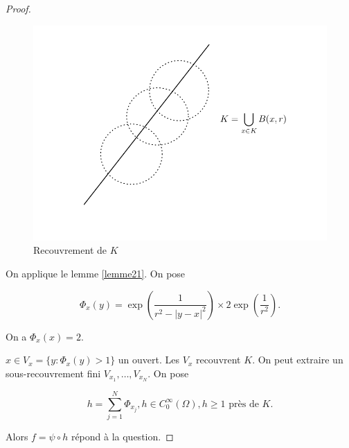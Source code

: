 \documentclass[french]{book}
\theoremstyle{definition}
\theoremstyle{remark}
\newcommand{\biggg}{>}
\newcommand{\bg}{\biggg}
\begin{document}
\begin{proof}

  \begin{figure}[h!]
    \centering
    \includegraphics[scale=0.3]{figures/part_unit_diff21.png}
    \caption{Recouvrement de \(K\)}
    \label{}
  \end{figure}

  On applique le lemme \ref{lemme21}. On pose

  \[\Phi_x(y) = \exp \left(\frac{1}{r ^2- \left\lvert y-x \right\rvert ^2}\right) \times 2 \exp \left(\frac{1}{r ^2}\right).\]

  On a \(\Phi_x(x) = 2\).

  \(x \in V_x = \{ y : \Phi_x(y) \bg 1 \}\) un ouvert. Les \(V_x\) recouvrent \(K\). On peut extraire un sous-recouvrement fini \(V _{x_1}, \dots, V _{x_N}\). On pose

  \[h = \sum_{j=1}^{N} \Phi _{x_j}, h \in C_0 ^{\infty}(\Omega), h \geq 1 \text{ près de } K.\]

  Alors \(f = \psi \circ h\) répond à la question.
\end{proof}
\end{document}
